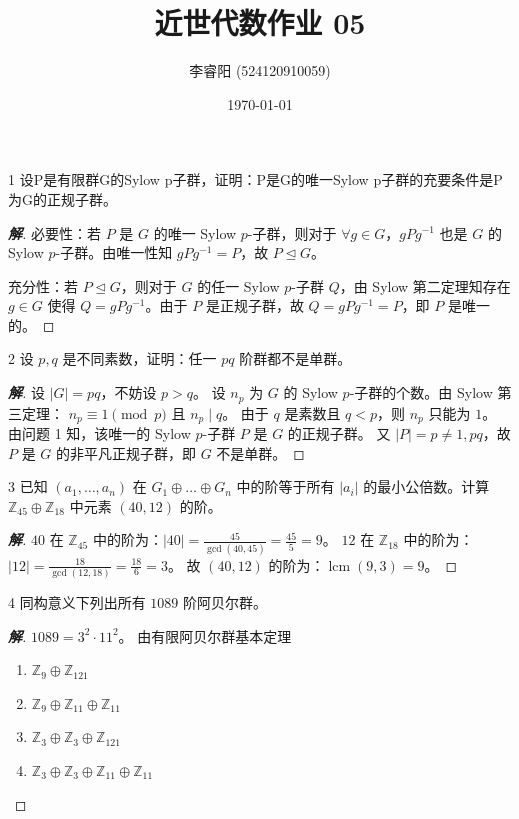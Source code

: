 \documentclass[12pt, a4paper]{article}
\title{近世代数作业 05}
\author{李睿阳 (524120910059)}
\date{\today}
\newenvironment{solution}{
    \begin{proof}[\textbf{解}]
}{
    \end{proof}
}
\begin{document}
\maketitle


\begin{problem}{1}
    设P是有限群G的Sylow p子群，证明：P是G的唯一Sylow p子群的充要条件是P为G的正规子群。
\end{problem}
\begin{solution}
    必要性：若 $P$ 是 $G$ 的唯一 Sylow $p$-子群，则对于 $\forall g \in G$，$gPg^{-1}$ 也是 $G$ 的 Sylow $p$-子群。由唯一性知 $gPg^{-1} = P$，故 $P \trianglelefteq G$。

    充分性：若 $P \trianglelefteq G$，则对于 $G$ 的任一 Sylow $p$-子群 $Q$，由 Sylow 第二定理知存在 $g \in G$ 使得 $Q = gPg^{-1}$。由于 $P$ 是正规子群，故 $Q = gPg^{-1} = P$，即 $P$ 是唯一的。
\end{solution}


\begin{problem}{2}
    设 $p,q$ 是不同素数，证明：任一 $pq$ 阶群都不是单群。
\end{problem}
\begin{solution}
    设 $|G| = pq$，不妨设 $p > q$。
    设 $n_p$ 为 $G$ 的 Sylow $p$-子群的个数。由 Sylow 第三定理：
    $n_p \equiv 1 \pmod p$ 且 $n_p \mid q$。
    由于 $q$ 是素数且 $q < p$，则 $n_p$ 只能为 $1$。
    由问题 1 知，该唯一的 Sylow $p$-子群 $P$ 是 $G$ 的正规子群。
    又 $|P| = p \neq 1, pq$，故 $P$ 是 $G$ 的非平凡正规子群，即 $G$ 不是单群。
\end{solution}


\begin{problem}{3}
    已知 $(a_1,\dots,a_n)$ 在 $G_1 \oplus \dots \oplus G_n$ 中的阶等于所有 $|a_i|$ 的最小公倍数。计算 $\mathbb{Z}_{45} \oplus \mathbb{Z}_{18}$ 中元素 $(40,12)$ 的阶。
\end{problem}
\begin{solution}
    $40$ 在 $\mathbb{Z}_{45}$ 中的阶为：$|40| = \frac{45}{\gcd(40,45)} = \frac{45}{5} = 9$。
    $12$ 在 $\mathbb{Z}_{18}$ 中的阶为：$|12| = \frac{18}{\gcd(12,18)} = \frac{18}{6} = 3$。
    故 $(40,12)$ 的阶为：$\operatorname{lcm}(9,3) = 9$。
\end{solution}
    

\begin{problem}{4}
    同构意义下列出所有 $1089$ 阶阿贝尔群。
\end{problem}
\begin{solution}
    $1089 = 3^2 \cdot 11^2$。
    由有限阿贝尔群基本定理
    \begin{enumerate}
        \item $\mathbb{Z}_{9} \oplus \mathbb{Z}_{121}$
        \item $\mathbb{Z}_{9} \oplus \mathbb{Z}_{11} \oplus \mathbb{Z}_{11}$
        \item $\mathbb{Z}_{3} \oplus \mathbb{Z}_{3} \oplus \mathbb{Z}_{121}$
        \item $\mathbb{Z}_{3} \oplus \mathbb{Z}_{3} \oplus \mathbb{Z}_{11} \oplus \mathbb{Z}_{11}$
    \end{enumerate}
\end{solution}
\end{document}
